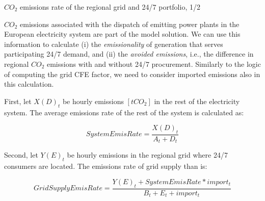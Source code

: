 \begin{frame}{$CO_2$ emissions rate of the regional grid and 24/7 portfolio, 1/2}

  {\small

  \alert{$CO_2$ emissions} associated with the dispatch of emitting power plants 
  in the European electricity system are part of the model solution.
  We can use this information to calculate (i) the \emph{emissionality} of generation 
  that serves participating 24/7 demand, and (ii) the \emph{avoided emissions}, i.e.,
  the difference in regional $CO_2$ emissions with and without 24/7 procurement. 
  Similarly to the logic of computing the grid CFE factor, 
  we need to consider imported emissions also in this calculation.
  
  First, let $X(D)_t$ be hourly emissions $[tCO_2]$ in the rest of the electricity system. 
  The average emissions rate of the rest of the system is calculated as:

  \begin{equation*}
  SystemEmisRate = \frac{X(D)_t}{A_t + D_t}
  \end{equation*}

  Second, let $Y(E)_t$ be hourly emissions in the regional grid where 24/7 consumers are located.
  The emissions rate of grid supply than is:

  \begin{equation*}
  GridSupplyEmisRate = \frac{Y(E)_t + SystemEmisRate * import_t}{B_t + E_t + import_t}
  \end{equation*}

  }
\end{frame}



